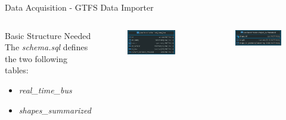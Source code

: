 \documentclass[xcolor=dvipsnames,table]{beamer}
\begin{document}
\begin{frame}{Data Acquisition - GTFS Data Importer}
        \begin{columns}
                \begin{block}{Basic Structure Needed}
                        The \textit{schema.sql} defines the two following tables:
                        \begin{itemize}
                                \item {\em  real\_time\_bus}
                                \item {\em  shapes\_summarized}
                        \end{itemize}
                \end{block}
                \centering
                \begin{figure}[H]
                        \centering
                        \includegraphics[scale=0.25]{images/real_time_bus_ER.png}
                \end{figure}
                \begin{figure}[H]
                        \centering
                        \includegraphics[scale=0.25]{images/shapes_summarized_ER.png}
                \end{figure}
        \end{columns}
\end{frame}
\end{document}
